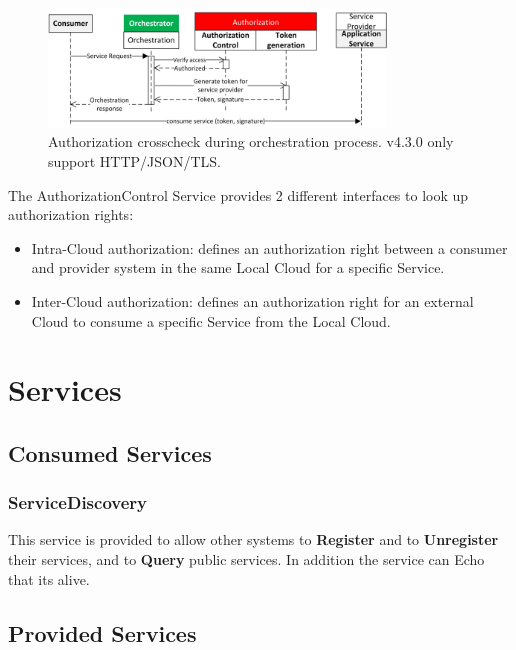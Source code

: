 \documentclass[a4paper]{arrowhead}
\newcommand{\spdef}[2]{{\textcolor{ArrowheadBlue}{#2\label{sec:services:produced:#1}}}}
\begin{document}
\begin{figure}[t!]
  \centering 
  \includegraphics[width=0.8\textwidth]{figures/authorization_crosscheck.png}
  \caption{Authorization crosscheck during orchestration process. v4.3.0 only support HTTP/JSON/TLS.}
  \label{fig:ServiceRegistrySysDD}
\end{figure}

The AuthorizationControl Service provides 2 different interfaces to look up authorization rights:

\begin{itemize}
    \item Intra-Cloud authorization: defines an authorization right between a consumer and provider system in the same Local Cloud for a specific Service.
    \item Inter-Cloud authorization: defines an authorization right for an external Cloud to consume a specific Service from the Local Cloud.
\end{itemize}

\section{Services}
\label{sec:services}


\subsection{Consumed Services}

\subsubsection{\spdef{ServiceDiscovery}{ServiceDiscovery}}

This service is provided to allow other systems to \textbf{Register}
and to \textbf{Unregister} their services, and to \textbf{Query}
public services. In addition the service can Echo that its alive.

\subsection{Provided Services}
\end{document}
